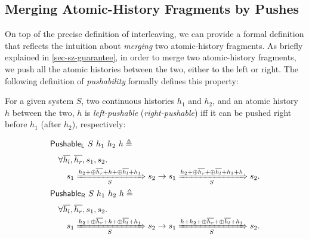 \documentclass[sigplan,10pt,review,anonymous,screen]{acmart}\settopmatter{printfolios=true,printccs=false,printacmref=false}
\begin{document}
\subsection{Merging Atomic-History Fragments by Pushes}

\newcommand{\lpush}[4]{\ensuremath{\mathsf{Pushable}_{\mathsf{L}}\ #1\ #2\ #3\ #4}}
\newcommand{\rpush}[4]{\ensuremath{\mathsf{Pushable}_{\mathsf{R}}\ #1\ #2\ #3\ #4}}
\newcommand{\hmgb}[3]{\ensuremath{#1 \vdash #2 \bowtie #3}}
\newcommand{\smgb}[1]{\ensuremath{\mathsf{Mergeable}\ #1}}

On top of the precise definition of interleaving, we can provide a formal definition that reflects the intuition about \emph{merging} two atomic-history fragments.
As briefly explained in \autoref{sec-sz-guarantee}, in order to merge two atomic-history fragments, we push all the atomic histories between the two, either to the left or right.
The following definition of \emph{pushability} formally defines this property:
\begin{definition}
  For a given system $S$, two continuous histories $h_1$ and $h_2$, and an atomic history $h$ between the two, $h$ is \emph{left-pushable} (\emph{right-pushable}) iff it can be pushed right before $h_1$ (after $h_2$), respectively:
  \begin{displaymath}
    \renewcommand{\arraystretch}{1.6}
    \begin{array}{l}
      \lpush{S}{h_1}{h_2}{h} \triangleq\\
      \quad \forall \listof{h_l}, \listof{h_r}, s_1, s_2.\\
      \quad\quad \semsteps{S}{s_1}{\listapp{h_2}{\listapp{\listconcat{\listof{h_r}}}{\listapp{h}{\listapp{\listconcat{\listof{h_l}}}{h_1}}}}}{s_2}
      \to \semsteps{S}{s_1}{\listapp{h_2}{\listapp{\listconcat{\listof{h_r}}}{\listapp{\listconcat{\listof{h_l}}}{\listapp{h_1}{h}}}}}{s_2}.\\
      \rpush{S}{h_1}{h_2}{h} \triangleq\\
      \quad \forall \listof{h_l}, \listof{h_r}, s_1, s_2.\\
      \quad\quad \semsteps{S}{s_1}{\listapp{h_2}{\listapp{\listconcat{\listof{h_r}}}{\listapp{h}{\listapp{\listconcat{\listof{h_l}}}{h_1}}}}}{s_2}
      \to \semsteps{S}{s_1}{\listapp{h}{\listapp{h_2}{\listapp{\listconcat{\listof{h_r}}}{\listapp{\listconcat{\listof{h_l}}}{h_1}}}}}{s_2}.\\
    \end{array}
  \end{displaymath}
\end{definition}
\end{document}
